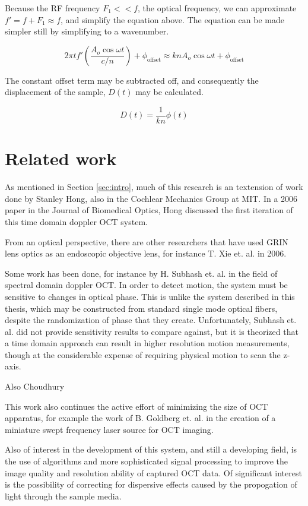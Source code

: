 Because the RF frequency $F_1 << f$, the optical frequency, we can approximate $f' = f + F_1 \approx f$, and simplify the equation above. The equation can be made simpler still by simplifying to a wavenumber.

\begin{equation}
2 \pi t f'  \left( \frac{A_o \cos{\omega t}}{c/n} \right) + \phi_{\mathrm{offset}} \approx k n A_o \cos{\omega t} + \phi_{\mathrm{offset}}
\end{equation}

The constant offset term may be subtracted off, and consequently the displacement of the sample, $D(t)$ may be calculated.


\begin{equation}
D(t) = \frac{1}{kn} \phi(t)
\end{equation}

\section{Related work}

As mentioned in Section \ref{sec:intro}, much of this research is an textension of work done by Stanley Hong, also in the Cochlear Mechanics Group at MIT. In a 2006 paper in the Journal of Biomedical Optics, Hong discussed the first iteration of this time domain doppler OCT system. \cite{hong}

From an optical perspective, there are other researchers that have used GRIN lens optics as an endoscopic objective lens, for instance T. Xie et. al. in 2006. \cite{Xie2006}


Some work has been done, for instance by H. Subhash et. al. in the field of spectral domain doppler OCT. \cite{Subhash2012} In order to detect motion, the system must be sensitive to changes in optical phase. This is unlike the system described in this thesis, which may be constructed from standard single mode optical fibers, despite the randomization of phase that they create. Unfortunately, Subhash et. al. did not provide sensitivity results to compare against, but it is theorized that a time domain approach can result in higher resolution motion measurements, though at the considerable expense of requiring physical motion to scan the z-axis.

Also Choudhury \cite{Choudhury2011}

This work also continues the active effort of minimizing the size of OCT apparatus, for example the work of B. Goldberg et. al. in the creation of a miniature swept frequency laser source for OCT imaging. \cite{Goldberg2009}

Also of interest in the development of this system, and still a developing field, is the use of algorithms and more sophisticated signal processing to improve the image quality and resolution ability of captured OCT data. Of significant interest is the possibility of correcting for dispersive effects caused by the propogation of light through the sample media. \cite{Xie2005} \cite{DrexlerBook}
